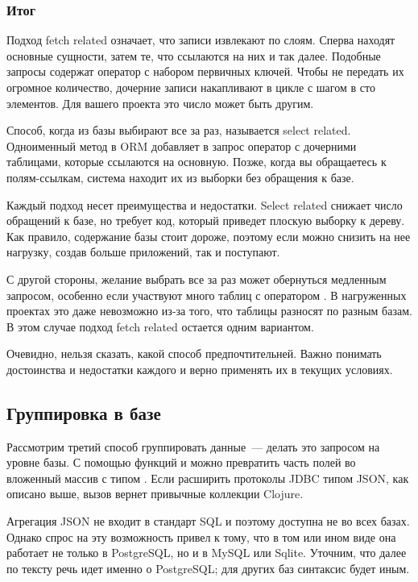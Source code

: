 \subsubsection{Итог}

Подход fetch related означает, что записи извлекают по слоям. Сперва находят основные сущности, затем те, что ссылаются на них и так далее. Подобные запросы содержат оператор  с набором первичных ключей. Чтобы не передать их огромное количество, дочерние записи накапливают в цикле с шагом в сто элементов. Для вашего проекта это число может быть другим.

Способ, когда из базы выбирают все за раз, называется select related. Одноименный метод в ORM добавляет в запрос оператор  с дочерними таблицами, которые ссылаются на основную. Позже, когда вы обращаетесь к полям-ссылкам, система находит их из выборки без обращения к базе.

Каждый подход несет преимущества и недостатки. Select related снижает число обращений к базе, но требует код, который приведет плоскую выборку к дереву. Как правило, содержание базы стоит дороже, поэтому если можно снизить на нее нагрузку, создав больше приложений, так и поступают.

С другой стороны, желание выбрать все за раз может обернуться медленным запросом, особенно если участвуют много таблиц с оператором . В нагруженных проектах это даже невозможно из-за того, что таблицы разносят по разным базам. В этом случае подход fetch related остается одним вариантом.

Очевидно, нельзя сказать, какой способ предпочтительней. Важно понимать достоинства и недостатки каждого и верно применять их в текущих условиях.

\subsection{Группировка в базе}

Рассмотрим третий способ группировать данные~--- делать это запросом на уровне базы. С помощью функций  и  можно превратить часть полей во вложенный массив с типом . Если расширить протоколы JDBC типом JSON, как описано выше, вызов  вернет привычные коллекции Clojure.

Агрегация JSON не входит в стандарт SQL и поэтому доступна не во всех базах. Однако спрос на эту возможность привел к тому, что в том или ином виде она работает не только в PostgreSQL, но и в MySQL или Sqlite. Уточним, что далее по тексту речь идет именно о PostgreSQL; для других баз синтаксис будет иным.

